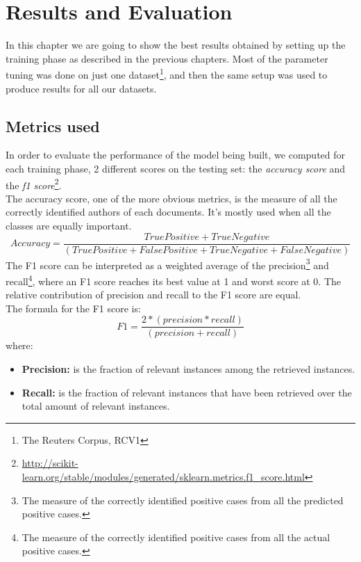 \chapter{Results and Evaluation}
In this chapter we are going to show the best results obtained by setting up the training phase as described in the previous chapters. Most of the parameter tuning was done on just one dataset\footnote{The Reuters Corpus, RCV1}, and then the same setup was used to produce results for all our datasets.

\section{Metrics used}
In order to evaluate the performance of the model being built, we computed for each training phase, 2 different scores on the testing set: the \textit{accuracy score} and the \textit{f1 score}\footnote{\url{http://scikit-learn.org/stable/modules/generated/sklearn.metrics.f1_score.html}}.\\ 
The accuracy score, one of the more obvious metrics, is the measure of all the correctly identified authors of each documents. It's mostly used when all the classes are equally important.
\begin{equation}
Accuracy = \frac{True Positive + True Negative}{(True Positive + False Positive + True Negative + False Negative)}
\end{equation}
The F1 score can be interpreted as a weighted average of the precision\footnote{The measure of the correctly identified positive cases from all the predicted positive cases.} and recall\footnote{The measure of the correctly identified positive cases from all the actual positive cases.}, where an F1 score reaches its best value at 1 and worst score at 0. The relative contribution of precision and recall to the F1 score are equal.\\The formula for the F1 score is:\\
\begin{equation}
F1 = \frac{2 * (precision * recall)}{(precision + recall)}
\end{equation}
where:
\begin{itemize}
	\item \textbf{Precision:} is the fraction of relevant instances among the retrieved instances.
	\item \textbf{Recall:} is the fraction of relevant instances that have been retrieved over the total amount of relevant instances.
\end{itemize}


